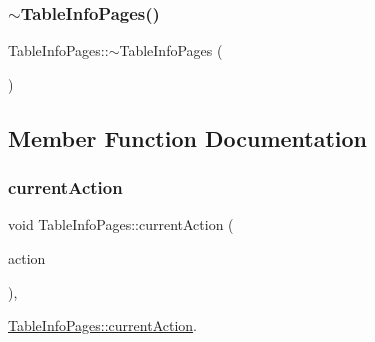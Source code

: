 \subsubsection{\texorpdfstring{$\sim$TableInfoPages()}{~TableInfoPages()}}
{\footnotesize\ttfamily Table\+Info\+Pages\+::$\sim$\+Table\+Info\+Pages (\begin{DoxyParamCaption}{ }\end{DoxyParamCaption})}



\subsection{Member Function Documentation}
\mbox{\label{class_table_info_pages_ad1da457e9ca5163f17d14035185457f7}} 
\subsubsection{\texorpdfstring{currentAction}{currentAction}}
{\footnotesize\ttfamily void Table\+Info\+Pages\+::current\+Action (\begin{DoxyParamCaption}\item[{Q\+Action $\ast$}]{action }\end{DoxyParamCaption})\hspace{0.3cm}{\ttfamily [private]}, {\ttfamily [slot]}}



\mbox{\hyperlink{class_table_info_pages_ad1da457e9ca5163f17d14035185457f7}{Table\+Info\+Pages\+::current\+Action}}. 


